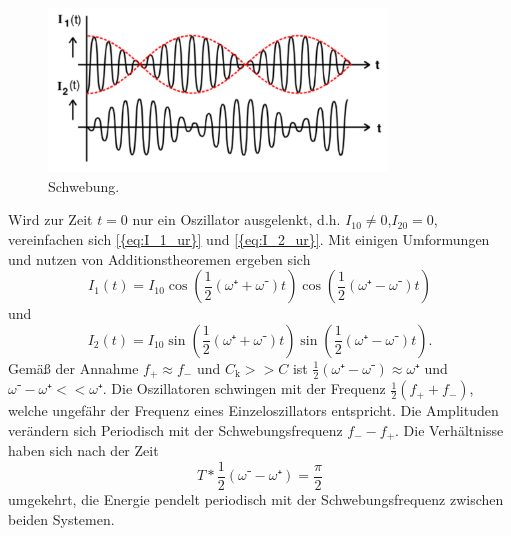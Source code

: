 \begin{figure}[h]
	\centering
	\label{fig:schwebung}
		\includegraphics[width=0.8\textwidth]{Bilder/Schwebung.pdf}
		\caption{Schwebung.}
\end{figure}

Wird zur Zeit $t=0$ nur ein Oszillator ausgelenkt, d.h. $I_{10}\neq0$,$I_{20}=0$, vereinfachen sich \eqref{{eq:I_1_ur}} und \eqref{{eq:I_2_ur}}. 
Mit einigen Umformungen und nutzen von Additionstheoremen ergeben sich
\begin{equation}
	I_1(t)=I_{10}\cos(\frac{1}{2}(\omega⁺+\omega⁻)t)\cos(\frac{1}{2}(\omega⁺-\omega⁻)t)
\end{equation}
und
\begin{equation}
	I_2(t)=I_{10}\sin(\frac{1}{2}(\omega⁺+\omega⁻)t)\sin(\frac{1}{2}(\omega⁺-\omega⁻)t).
\end{equation}
Gemäß der Annahme $f_+\approx f_-$ und $C_\mathup{k}>>C$ ist $\frac{1}{2}(\omega⁺-\omega⁻)\approx\omega⁺$ und $\omega⁻-\omega⁺<<\omega⁺$.
Die Oszillatoren schwingen mit der Frequenz $\frac{1}{2}(f_+ + f_-)$, welche ungefähr der Frequenz eines Einzeloszillators entspricht. 
Die Amplituden verändern sich Periodisch mit der Schwebungsfrequenz $f_- - f_+$. 
Die Verhältnisse haben sich nach der Zeit 
\begin{equation}
T*\frac{1}{2}({\omega⁻-\omega⁺})=\frac{\pi}{2}
\end{equation}
 umgekehrt, die Energie pendelt periodisch mit der Schwebungsfrequenz zwischen beiden Systemen.

\newpage
